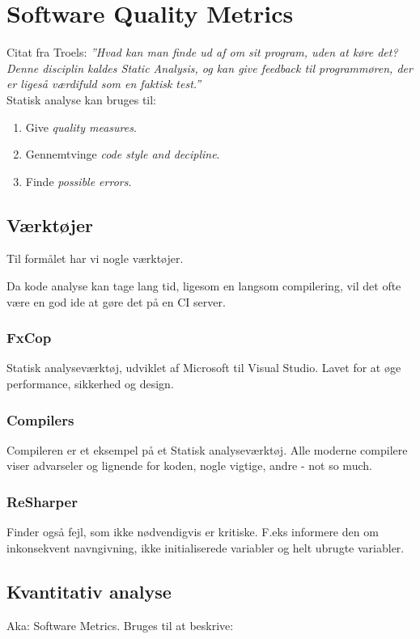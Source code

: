 \section{Software Quality Metrics}
Citat fra Troels: \textit{''Hvad kan man finde ud af om sit program, uden at køre det? Denne disciplin kaldes Static Analysis, og kan give feedback til programmøren, der er ligeså værdifuld som en faktisk test.''}\\

Statisk analyse kan bruges til: 

\begin{enumerate}
	\item Give \textit{quality measures}.
	\item Gennemtvinge \textit{code style and decipline}.
	\item Finde \textit{possible errors}.
\end{enumerate}

\subsection{Værktøjer} 
Til formålet har vi nogle værktøjer. 

Da kode analyse kan tage lang tid, ligesom en langsom compilering, vil det ofte være en god ide at gøre det på en CI server.

\subsubsection{FxCop}
Statisk analyseværktøj, udviklet af Microsoft til Visual Studio. Lavet for at øge performance, sikkerhed og design.

\subsubsection{Compilers}
Compileren er et eksempel på et Statisk analyseværktøj. Alle moderne compilere viser advarseler og lignende for koden, nogle vigtige, andre - not so much.

\subsubsection{ReSharper}
Finder også fejl, som ikke nødvendigvis er kritiske. F.eks informere den om inkonsekvent navngivning, ikke initialiserede variabler og helt ubrugte variabler.

\subsection{Kvantitativ analyse}
Aka: Software Metrics. Bruges til at beskrive: 

